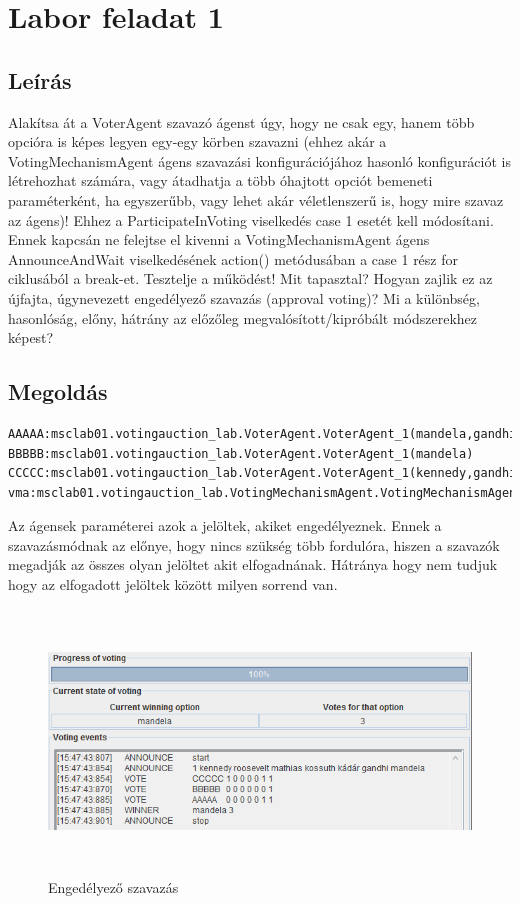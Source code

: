 \section{Labor feladat 1}
\subsection{Leírás}
Alakítsa át a VoterAgent szavazó ágenst úgy, hogy ne csak egy, hanem több opcióra is
képes legyen egy-egy körben szavazni (ehhez akár a VotingMechanismAgent ágens
szavazási konfigurációjához hasonló konfigurációt is létrehozhat számára, vagy átadhatja a
több óhajtott opciót bemeneti paraméterként, ha egyszerűbb, vagy lehet akár véletlenszerű is,
hogy mire szavaz az ágens)! Ehhez a ParticipateInVoting viselkedés case 1 esetét
kell módosítani. Ennek kapcsán ne felejtse el kivenni a VotingMechanismAgent ágens
AnnounceAndWait viselkedésének action() metódusában a case 1 rész for
ciklusából a break-et. Tesztelje a működést! Mit tapasztal? Hogyan zajlik ez az újfajta,
úgynevezett engedélyező szavazás (approval voting)? Mi a különbség, hasonlóság, előny,
hátrány az előzőleg megvalósított/kipróbált módszerekhez képest?
\subsection{Megoldás}
\begin{lstlisting}[caption=Engedélyező run-config, frame=single,float=!ht]
AAAAA:msclab01.votingauction_lab.VoterAgent.VoterAgent_1(mandela,gandhi)
BBBBB:msclab01.votingauction_lab.VoterAgent.VoterAgent_1(mandela)
CCCCC:msclab01.votingauction_lab.VoterAgent.VoterAgent_1(kennedy,gandhi,mandela)
vma:msclab01.votingauction_lab.VotingMechanismAgent.VotingMechanismAgent(voting01.cfg)
\end{lstlisting}
Az ágensek paraméterei azok a jelöltek, akiket engedélyeznek. Ennek a szavazásmódnak az előnye, hogy nincs szükség több fordulóra, hiszen a szavazók megadják az összes olyan jelöltet akit elfogadnának. Hátránya hogy nem tudjuk hogy az elfogadott jelöltek között milyen sorrend van.
\begin{figure}[!h]
\begin{center}
\includegraphics[height=7cm]{figures/fel1.png}
\caption{Engedélyező szavazás}
\end{center}
\end{figure}


